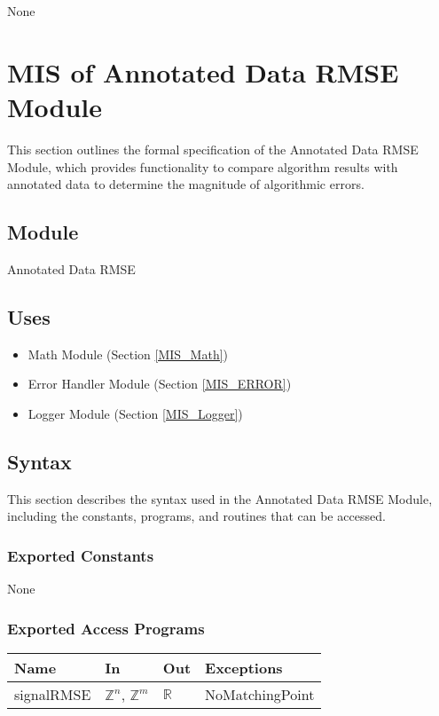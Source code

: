 \documentclass[12pt, titlepage]{article}
\begin{document}
None

\newpage

\section{MIS of Annotated Data RMSE Module} \label{MIS_RMSE}

This section outlines the formal specification of the Annotated Data RMSE
Module, which provides functionality to compare algorithm results with annotated
data to determine the magnitude of algorithmic errors.

\subsection{Module}

Annotated Data RMSE

\subsection{Uses}

\begin{itemize}
\item Math Module (Section \ref{MIS_Math})
\item Error Handler Module (Section \ref{MIS_ERROR})
\item Logger Module (Section \ref{MIS_Logger})
\end{itemize}

\subsection{Syntax}

This section describes the syntax used in the Annotated Data RMSE Module,
including the constants, programs, and routines that can be accessed.

\subsubsection{Exported Constants}

None

\subsubsection{Exported Access Programs}

\begin{center}
\begin{tabular}{p{2.5cm} p{4.5cm} p{4.5cm} p{3.5cm}}
\hline
\textbf{Name} & \textbf{In} & \textbf{Out} & \textbf{Exceptions} \\
\hline
signalRMSE & $\mathbb{Z}^n$, $\mathbb{Z}^m$ & $\mathbb{R}$ & NoMatchingPoint \\
\hline
\end{tabular}
\end{center}
\end{document}
